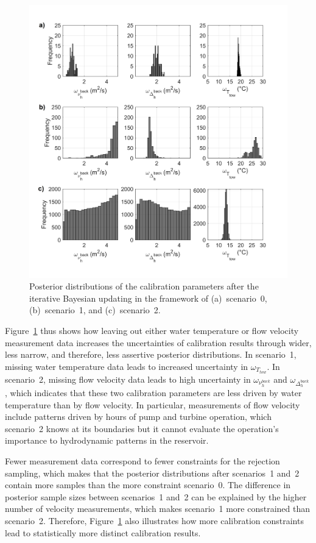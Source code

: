 \documentclass[draft,linenumbers,onecolumn]{agujournal2019} %
\begin{document}
\begin{figure}
	\centering
	\includegraphics[width=14.5cm]{posterior_distributions.png}
	\caption{Posterior distributions of the calibration parameters after the iterative Bayesian updating in the framework of (a)~scenario~0, (b)~scenario~1, and (c)~scenario~2.}
	\label{fig03:posteriors}
\end{figure}

Figure~\ref{fig03:posteriors} thus shows how leaving out either water temperature or flow velocity measurement data increases the uncertainties of calibration results through wider, less narrow, and therefore, less assertive posterior distributions. In scenario~1, missing water temperature data leads to increased uncertainty in \(\omega_{T_{tow}}\). In scenario~2, missing flow velocity data leads to high uncertainty in \(\omega_{\nu_{h}^{back}}\) and \(\omega_{\Delta_{h}^{back}}\), which indicates that these two calibration parameters are less driven by water temperature than by flow velocity. In particular, measurements of flow velocity include patterns driven by hours of pump and turbine operation, which scenario~2 knows at its boundaries but it cannot evaluate the operation's importance to hydrodynamic patterns in the reservoir.

Fewer measurement data correspond to fewer constraints for the rejection sampling, which makes that the posterior distributions after scenarios~1 and~2 contain more samples than the more constraint scenario~0. The difference in posterior sample sizes between scenarios~1 and~2 can be explained by the higher number of velocity measurements, which makes scenario~1 more constrained than scenario~2. Therefore, Figure~\ref{fig03:posteriors} also illustrates how more calibration constraints lead to statistically more distinct calibration results.
\end{document}
